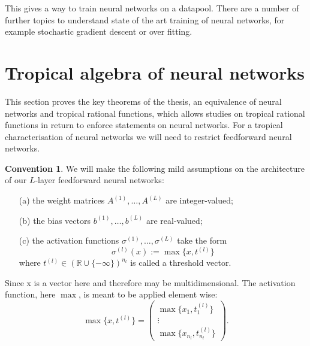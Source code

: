 \documentclass{article}
\theoremstyle{definition}
\newtheorem{remark}[theorem]{Remark}
\newtheorem{convention}[theorem]{Convention}
\begin{document}

This gives a way to train neural networks on a datapool. There are a number of further topics to understand state of the art training of neural networks, for example stochastic gradient descent or over fitting\cite{bishop2006pattern}.
\newpage

\section{Tropical algebra of neural networks}\label{sec:trop_netw}

This section proves the key theorems of the thesis, an equivalence of neural networks and tropical rational functions, which allows studies on tropical rational functions in return to enforce statements on neural networks. For a tropical characterisation of neural networks we will need to restrict feedforward neural networks.

\begin{convention}\hspace{1sp}\cite{zhang2018tropical}
We will make the following mild assumptions
on the architecture of our $L$-layer feedforward neural networks:
\begin{itemize}
\item[(a)]
the weight matrices $A^{(1)} , \dots , A^{(L)}$ are integer-valued;
\item[(b)]
the bias vectors $b^{(1)} , \dots , b^{(L)}$ are real-valued;
\item[(c)]
the activation functions $\sigma^{(1)} , \dots , \sigma^{(L)}$ take the form
$$\sigma^{(l)}(x) := \max\{x, t^{(l)}\}$$
where $t^{(l)} \in (\mathbb{R} \cup \{-\infty \})^{n_l}$ is called a threshold vector.
\end{itemize}
Since x is a vector here and therefore may be multidimensional. The activation function, here $\max$, is meant to be applied element wise:
$$\max\{x, t^{(l)}\}=\begin{pmatrix}\max\{x_1, t^{(l)}_1 \}\\ \vdots \\ \max\{x_{n_l}, t^{(l)}_{n_l} \}\end{pmatrix}.$$
\end{convention}
\end{document}
